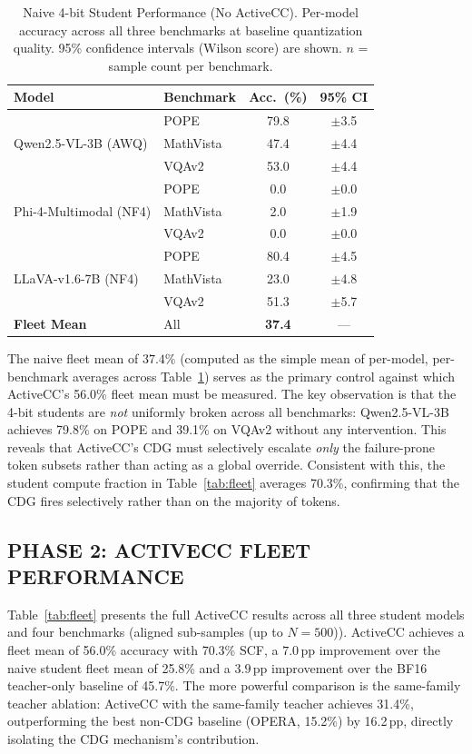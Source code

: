 \documentclass{ieeetmlcn}
\begin{document}
\begin{table}[htbp]
\caption{Naive 4-bit Student Performance (No ActiveCC). Per-model accuracy across all three benchmarks at baseline quantization quality. 95\% confidence intervals (Wilson score) are shown. $n$ = sample count per benchmark.}
\label{tab:naivebaseline}
\centering
\begin{tabular}{llcc}
\toprule
\textbf{Model} & \textbf{Benchmark} & \textbf{Acc.\ (\%)} & \textbf{95\% CI} \\
\midrule
\multirow{3}{*}{Qwen2.5-VL-3B (AWQ)}
  & POPE      & 79.8 & $\pm$3.5 \\
  & MathVista & 47.4 & $\pm$4.4 \\
  & VQAv2     & 53.0 & $\pm$4.4 \\
\midrule
\multirow{3}{*}{Phi-4-Multimodal (NF4)}
  & POPE      &  0.0 & $\pm$0.0 \\
  & MathVista &  2.0 & $\pm$1.9 \\
  & VQAv2     &  0.0 & $\pm$0.0 \\
\midrule
\multirow{3}{*}{LLaVA-v1.6-7B (NF4)}
  & POPE      & 80.4 & $\pm$4.5 \\
  & MathVista & 23.0 & $\pm$4.8 \\
  & VQAv2     & 51.3 & $\pm$5.7 \\
\midrule
\textbf{Fleet Mean} & All & \textbf{37.4} & --- \\
\bottomrule
\end{tabular}
\end{table}

The naive fleet mean of $37.4\%$ (computed as the simple mean of per-model, per-benchmark averages across Table~\ref{tab:naivebaseline}) serves as the primary control against which ActiveCC's 56.0\% fleet mean must be measured. The key observation is that the 4-bit students are \emph{not} uniformly broken across all benchmarks: Qwen2.5-VL-3B achieves 79.8\% on POPE and 39.1\% on VQAv2 without any intervention. This reveals that ActiveCC's CDG must selectively escalate \emph{only} the failure-prone token subsets rather than acting as a global override. Consistent with this, the student compute fraction in Table~\ref{tab:fleet} averages 70.3\%, confirming that the CDG fires selectively rather than on the majority of tokens.

\subsection{PHASE 2: ACTIVECC FLEET PERFORMANCE}
Table~\ref{tab:fleet} presents the full ActiveCC results across all three student models and four benchmarks (aligned sub-samples (up to $N=500$)). ActiveCC achieves a fleet mean of 56.0\% accuracy with 70.3\% SCF, a $7.0$\,pp improvement over the naive student fleet mean of 25.8\% and a $3.9$\,pp improvement over the BF16 teacher-only baseline of 45.7\%. The more powerful comparison is the same-family teacher ablation: ActiveCC with the same-family teacher achieves 31.4\%, outperforming the best non-CDG baseline (OPERA, 15.2\%) by 16.2\,pp, directly isolating the CDG mechanism's contribution.
\end{document}
